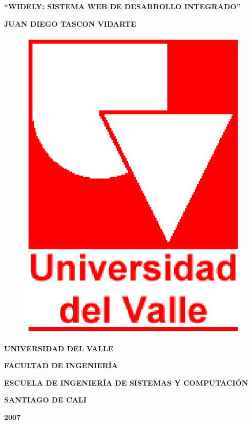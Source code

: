 
\begin{center} \textbf{\newline\newline} \end{center}
\begin{center} \textbf{``WIDELY: SISTEMA WEB DE DESARROLLO INTEGRADO''} \end{center}

\vspace{10em}

\begin{center} \textbf{JUAN DIEGO TASCON VIDARTE} \end{center}

\vspace{10em}


\begin{figure}[h]
	\centering
	\includegraphics[scale=0.3]{./img/uvlogo}
	\label{img:uvlogo-p1}
\end{figure}

\begin{center} \textbf{UNIVERSIDAD DEL VALLE} \end{center}
\begin{center} \textbf{FACULTAD DE INGENIERÍA} \end{center}
\begin{center} \textbf{ESCUELA DE INGENIERÍA DE SISTEMAS Y COMPUTACIÓN} \end{center}
\begin{center} \textbf{SANTIAGO DE CALI} \end{center}
\begin{center} \textbf{2007} \end{center}

